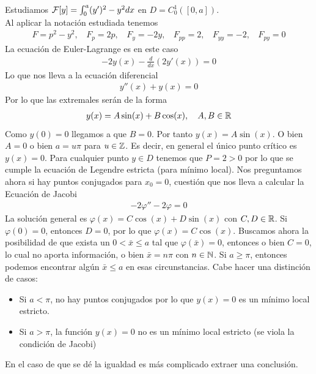 \begin{ejemplo}
    Estudiamos $\mathcal{F}[y] = \int_0^a (y')^2 - y^2 dx$ en $D=C_0^1([0,a])$.\\

    Al aplicar la notación estudiada tenemos 
    \begin{gather*}
        F=p^2 - y^2,\ \ \ \ F_p=2p,\ \ \ \ F_{y}=-2y,\ \ \ \ F_{pp}=2,\ \ \ \ F_{yy}=-2,\ \ \ \ F_{py}=0
    \end{gather*}
    La ecuación de Euler-Lagrange es en este caso 
    \begin{gather*}
        -2y(x) - \frac{d}{dx}(2y'(x)) = 0
    \end{gather*}
    Lo que nos lleva a la ecuación diferencial
    \begin{gather*}
        y''(x)+y(x)=0
    \end{gather*}
    Por lo que las extremales serán de la forma 
    \begin{gather*}
        y(x) = A\sin(x) + B\cos(x),\ \ \ A,B\in \mathbb{R}
    \end{gather*}
    Como $y(0)=0$ llegamos a que $B=0$. Por tanto $y(x)= A\sin(x)$. O bien $A=0$ o bien $a=u\pi$ para $u\in \mathbb{Z}$. Es decir, en general el único punto crítico es $y(x)=0$. Para cualquier punto $y\in D$ tenemos que $P=2>0$ por lo que se cumple la ecuación de Legendre estricta (para mínimo local). Nos preguntamos ahora si hay puntos conjugados para $x_0=0$, cuestión que nos lleva a calcular la Ecuación de Jacobi
    \begin{gather*}
        -2\varphi''-2\varphi = 0
    \end{gather*}
    La solución general es $\varphi(x) = C\cos(x) + D\sin(x)$ con $C,D\in \mathbb{R}$. Si $\varphi(0)=0$, entonces $D=0$, por lo que $\varphi(x) = C\cos(x)$. Buscamos ahora la posibilidad de que exista un $0<\bar{x}\leq a$ tal que $\varphi(\bar{x})=0$, entonces o bien $C=0$, lo cual no aporta información, o bien $\bar{x}=n\pi$ con $n\in \mathbb{N}$. Si $a\geq \pi$, entonces podemos encontrar algún $\bar{x}\leq a$ en esas circunstancias. Cabe hacer una distinción de casos:
    \begin{itemize}
        \item Si $a<\pi$, no hay puntos conjugados por lo que $y(x)=0$ es un mínimo local estricto.
        \item Si $a>\pi$, la función $y(x)=0$ no es un mínimo local estricto (se viola la condición de Jacobi) 
    \end{itemize}
    En el caso de que se dé la igualdad es más complicado extraer una conclusión.
\end{ejemplo}

